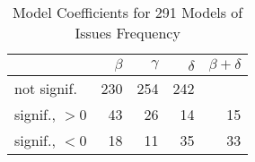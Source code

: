 
\begin{table}[t] \centering
\small
  \caption{Model Coefficients for 291 Models of Issues Frequency}
  \label{Table:rddmodels_issues}
\begin{tabular}{ l  r r r r }        
\hline 

 & $\beta$ & $\gamma$ & $\delta$ & $\beta + \delta$ \\ 
 \hline 
 \hline
not signif. & 230 & 254 & 242 & \\
\hline
signif., $>0$ & 43 & 26 & 14 & 15 \\
\hline
signif., $<0$ & 18 & 11 & 35 & 33 \\
\hline
\end{tabular}
\end{table}